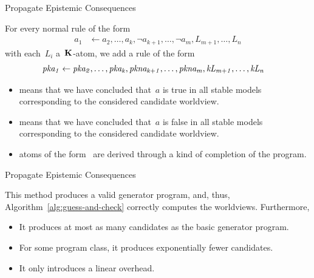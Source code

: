 \documentclass[aspectratio=169,svgnames,xcolor=table,t]{beamer}
\begin{document}
\begin{frame}{Propagate Epistemic Consequences}
    \begin{myitemize}
        \item[] For every normal rule of the form
        \begin{align}
            a_1 &\leftarrow 
            a_2,\!\dotsc\!,a_k,
            \neg a_{k+1},\!\dotsc\!,\neg a_m,
            {L_{m+1}},\!\dotsc\!,{L_n}
        \end{align}
        with each~$L_i$ a~$\mathbf{K}$-atom, we add a rule of the form
        \begin{gather}
            \begin{aligned}
                \kp{a_1} &\span\span\leftarrow 
                \kp{a_2},\dotsc,\kp{a_k},
                \kpnott{a_{k+1}},\dotsc,\kpnott{a_m},
                \kk{L_{m+1}},\dotsc,\kk{L_n}
            \end{aligned}
        \end{gather}
        \vspace*{-15pt}
        \begin{itemize}
            \item {} means that we have concluded that~$a$ is true in all stable models corresponding to the considered candidate worldview.
            \item {} means that we have concluded that~$a$ is false in all stable models corresponding to the considered candidate worldview.
            \item atoms of the form~ are derived through a kind of completion of the program.
        \end{itemize}
    \end{myitemize}
\end{frame}
\begin{frame}[c]{Propagate Epistemic Consequences}
    \begin{theorem}
        This method produces a valid generator program, and, thus, Algorithm~\ref{alg:guess-and-check} correctly computes the worldviews.
        Furthermore,
        \begin{itemize}
            \item It produces at most as many candidates as the basic generator program.
            \item For some program class, it produces exponentially fewer candidates.
            \item It only introduces a linear overhead.
        \end{itemize}
    \end{theorem}
\end{frame}
\end{document}
